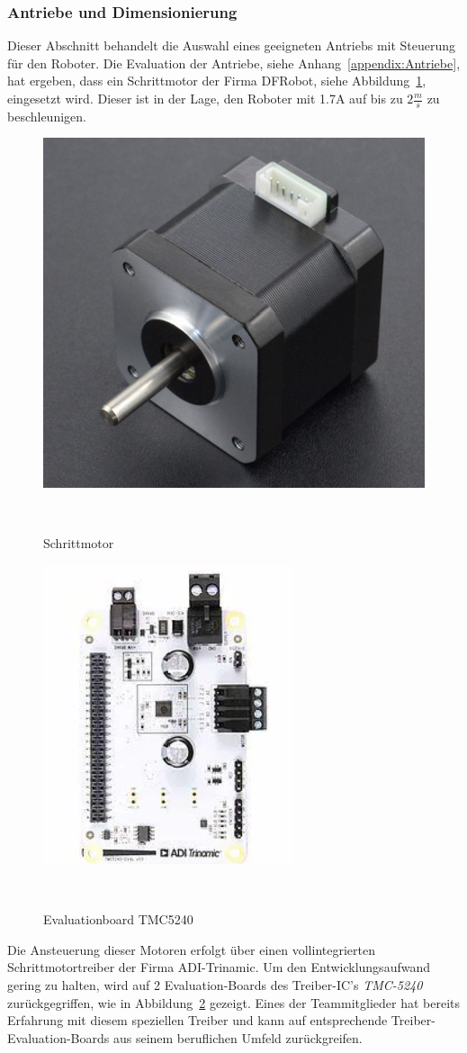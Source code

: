 \documentclass[main.tex]{subfiles} %
\begin{document}

\subsubsection{Antriebe und Dimensionierung}

Dieser Abschnitt behandelt die Auswahl eines geeigneten Antriebs mit Steuerung
für den Roboter. Die Evaluation der Antriebe, siehe
Anhang~\ref{appendix:Antriebe}, hat ergeben, dass ein Schrittmotor der Firma
DFRobot, siehe Abbildung~\ref{Schrittmotor_FIT0278}, eingesetzt wird. Dieser
ist in der Lage, den Roboter mit 1.7A auf bis zu $2\frac{m}{s}$ zu
beschleunigen.

\begin{figure}[H]
    \centering
    \includegraphics[width = 0.25 \linewidth]{fig_Antriebe_und_Dimensionierung/DFRobot_Stepper_FIT0278.png}
    \caption{Schrittmotor}~\label{Schrittmotor_FIT0278}
\end{figure}

\begin{figure}[H]
    \centering
    \includegraphics[width = 0.25 \linewidth]{fig_Antriebe_und_Dimensionierung/TMC_5240_EVAL.png}
    \caption{Evaluationboard TMC5240}~\label{Schrittmotorentreiber_EVAL}
\end{figure}

Die Ansteuerung dieser Motoren erfolgt über einen vollintegrierten
Schrittmotortreiber der Firma ADI-Trinamic. Um den Entwicklungsaufwand gering
zu halten, wird auf 2 Evaluation-Boards des Treiber-IC's \textit{TMC-5240}
zurückgegriffen, wie in Abbildung~\ref{Schrittmotorentreiber_EVAL} gezeigt.
Eines der Teammitglieder hat bereits Erfahrung mit diesem speziellen Treiber
und kann auf entsprechende Treiber-Evaluation-Boards aus seinem beruflichen
Umfeld zurückgreifen.
\end{document}
